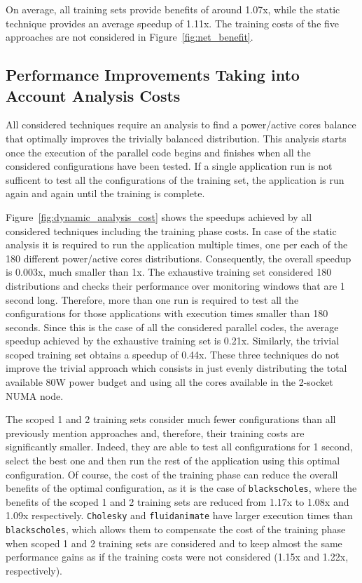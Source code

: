 On average, all  training sets provide benefits of around 1.07x, while the static
technique provides an average speedup of 1.11x.  The training costs of the five approaches
are not considered in Figure~\ref{fig:net_benefit}.

\subsection{Performance Improvements Taking into Account Analysis Costs}
\label{sec:costs}
All considered techniques require an analysis to find a power/active cores balance that
optimally improves the trivially balanced distribution.  This analysis starts once the
execution of the parallel code begins and finishes when all the considered configurations
have been tested.  If a single application run is not sufficent to test all the
configurations of the training set, the application is run again and again until the
training is complete.

Figure~\ref{fig:dynamic_analysis_cost} shows the speedups achieved by all considered
techniques including the training phase costs.  In case of the static analysis it is
required to run the application multiple times, one per each of the 180 different
power/active cores distributions.  Consequently, the overall speedup is 0.003x, much
smaller than 1x.  The exhaustive training set considered 180 distributions and checks
their performance over monitoring windows that are 1 second long.  Therefore, more than
one run is required to test all the configurations for those applications with execution
times smaller than 180 seconds.  Since this is the case of all the considered parallel
codes, the average speedup achieved by the exhaustive training set is 0.21x.  Similarly,
the trivial scoped training set obtains a speedup of 0.44x.  These three techniques do not
improve the trivial approach which consists in just evenly distributing the total
available 80W power budget and using all the cores available in the 2-socket NUMA node.

The scoped 1 and 2 training sets consider much fewer configurations than all  previously
mention approaches and, therefore, their training costs are significantly smaller.
Indeed, they are able to test all configurations for 1 second, select the best one and
then run the rest of the application using this optimal configuration.  Of course, the
cost of the training phase can reduce the overall benefits of the optimal configuration,
as it is the case of \texttt{blackscholes}, where the benefits of the scoped 1 and 2
training sets are reduced from 1.17x to 1.08x and 1.09x respectively.  \texttt{Cholesky}
and \texttt{fluidanimate} have larger execution times than \texttt{blackscholes}, which
allows them to compensate the cost of the training phase when scoped 1 and 2 training sets
are considered and to keep almost the same performance gains as if the training costs were
not considered (1.15x and 1.22x, respectively).

